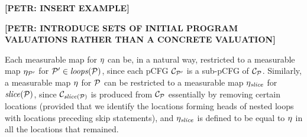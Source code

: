 \textbf{[PETR: INSERT EXAMPLE]}

\textbf{[PETR: INTRODUCE SETS OF INITIAL PROGRAM VALUATIONS RATHER THAN A 
CONCRETE VALUATION]}

Each measurable map for $\eta$ can be, in a natural way, restricted to a 
measurable map $\eta_{\mathcal{P}'}$ for $\mathcal{P}'\in \mathit{loops}(\mathcal{P})$, 
since each pCFG $\mathcal{C}_{\mathcal{P}'}$ is a sub-pCFG of $\mathcal{C}_{\mathcal{P}}$. 
Similarly, a measurable map $\eta$ for $\mathcal{P}$ can be restricted to a 
measurable map $\eta_{\mathit{slice}}$ for $\mathit{slice}(\mathcal{P})$, since 
$\mathcal{C}_{\mathit{slice}(\mathcal{P})}$ is produced from $\mathcal{C}_{\mathcal{P}}$ essentially by 
removing certain locations (provided that we identify the locations forming 
heads of nested loops with locations preceding skip statements), and 
$\eta_{\mathit{slice}}$ is defined to be equal to $\eta$ in all the locations that 
remained. 

